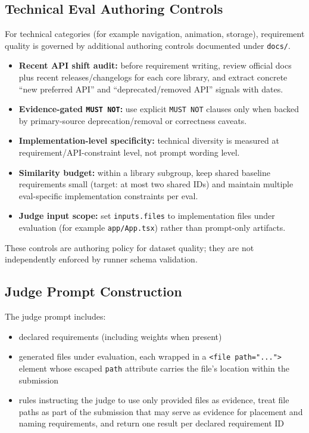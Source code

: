 \documentclass[11pt]{article}
\begin{document}
\subsection{Technical Eval Authoring Controls}
For technical categories (for example navigation, animation, storage), requirement quality is governed by additional authoring controls documented under \texttt{docs/}.
\begin{itemize}
  \item \textbf{Recent API shift audit:} before requirement writing, review official docs plus recent releases/changelogs for each core library, and extract concrete ``new preferred API'' and ``deprecated/removed API'' signals with dates.
  \item \textbf{Evidence-gated \texttt{MUST NOT}:} use explicit \texttt{MUST NOT} clauses only when backed by primary-source deprecation/removal or correctness caveats.
  \item \textbf{Implementation-level specificity:} technical diversity is measured at \\requirement/API-constraint level, not prompt wording level.
  \item \textbf{Similarity budget:} within a library subgroup, keep shared baseline requirements small (target: at most two shared IDs) and maintain multiple eval-specific implementation constraints per eval.
  \item \textbf{Judge input scope:} set \texttt{inputs.files} to implementation files under evaluation (for example \texttt{app/App.tsx}) rather than prompt-only artifacts.
\end{itemize}

These controls are authoring policy for dataset quality; they are not independently enforced by runner schema validation.

\subsection{Judge Prompt Construction}
The judge prompt includes:
\begin{itemize}
  \item declared requirements (including weights when present)
  \item generated files under evaluation, each wrapped in a \texttt{<file path="...">} element whose escaped \texttt{path} attribute carries the file's location within the submission
  \item rules instructing the judge to use only provided files as evidence, treat file paths as part of the submission that may serve as evidence for placement and naming requirements, and return one result per declared requirement ID
\end{itemize}
\end{document}
